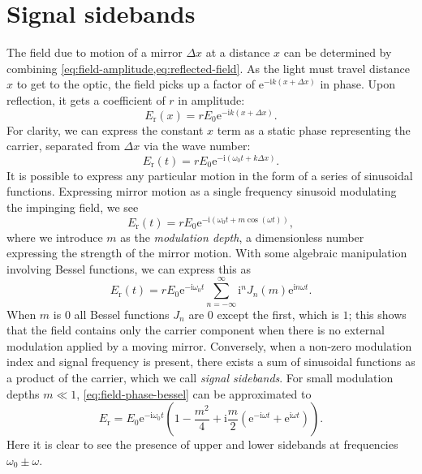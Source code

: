 \section{\label{sec:signal-sidebands}Signal sidebands}
The field due to motion of a mirror $\Delta x$ at a distance $x$ can be determined by combining \cref{eq:field-amplitude,eq:reflected-field}. As the light must travel distance $x$ to get to the optic, the field picks up a factor of $\text{e}^{-\text{i}k \left( x + \Delta x \right)}$ in phase. Upon reflection, it gets a coefficient of $r$ in amplitude:
\begin{equation}
  E_{\text{r}} \left( x \right) = r E_0 \text{e}^{-\text{i} k \left( x + \Delta x \right)}.
\end{equation}
For clarity, we can express the constant $x$ term as a static phase representing the carrier, separated from $\Delta x$ via the wave number:
\begin{equation}
  \label{eq:field-amplitude-phase}
  E_{\text{r}} \left( t \right) = r E_0 \text{e}^{-\text{i} \left( \omega_0 t + k \Delta x\right)}.
\end{equation}
It is possible to express any particular motion in the form of a series of sinusoidal functions. Expressing mirror motion as a single frequency sinusoid modulating the impinging field, we see
\begin{equation}
  \label{eq:field-phase-modulation}
  E_{\text{r}} \left( t \right) = r E_0 \text{e}^{-\text{i} \left(\omega_0 t + m \cos{\left( \omega t \right)} \right)},
\end{equation}
where we introduce $m$ as the \emph{modulation depth}, a dimensionless number expressing the strength of the mirror motion. With some algebraic manipulation involving Bessel functions, we can express this as~\cite{Freise2010}
\begin{equation}
  \label{eq:field-phase-bessel}
  E_{\text{r}} \left( t \right) = r E_0 \text{e}^{-\text{i} \omega_0 t} \sum^{\infty}_{n=-\infty} \text{i}^n J_{n} \left( m \right) \text{e}^{\text{i} n \omega t}.
\end{equation}
When $m$ is $0$ all Bessel functions $J_{n}$ are $0$ except the first, which is $1$; this shows that the field contains only the carrier component when there is no external modulation applied by a moving mirror. Conversely, when a non-zero modulation index and signal frequency is present, there exists a sum of sinusoidal functions as a product of the carrier, which we call \emph{signal sidebands}. For small modulation depths $m \ll 1$, \cref{eq:field-phase-bessel} can be approximated to
\begin{equation}
  \label{eq:field-phase-mod-expanded}
  E_{\text{r}} = E_0 \text{e}^{-\text{i} \omega_0 t} \left( 1 - \frac{m^2}{4} + \text{i} \frac{m}{2} \left( \text{e}^{-\text{i} \omega t} + \text{e}^{\text{i} \omega t} \right) \right).
\end{equation}
Here it is clear to see the presence of upper and lower sidebands at frequencies $\omega_0 \pm \omega$.

